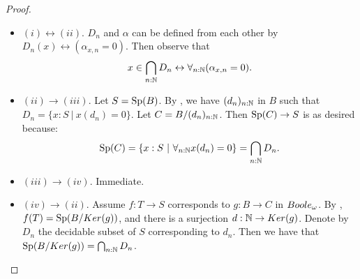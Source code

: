 \begin{proof}
\item 
  \begin{itemize}
  \item 
    $(i)\leftrightarrow (ii)$. $D_n$ and $\alpha$ can be defined from each other by 
     $D_n(x) \leftrightarrow (\alpha_{x,n} = 0)$. Then observe that
     \[
     x\in \bigcap_{n:\mathbb{N}} D_n \leftrightarrow 
      \forall_{n:\mathbb N} (\alpha_{x,n} = 0).
     \]
     
   \item $(ii) \to (iii)$. Let $S=\operatorname{Sp}(B)$. 
      By , we have $(d_n)_{n:\mathbb{N}}$ in $B$ such that $D_n = \{x:S\ |\ x(d_n) = 0\}$. 
      Let $C = B/(d_n)_{n:\mathbb{N}}$.
      Then $\operatorname{Sp}(C) \to S$ is as desired because:
      \[\operatorname{Sp}(C) = \{x:S\ |\ \forall_{n:\mathbb{N}} x(d_n) =0\}  = \bigcap_{n:\mathbb{N}} D_n.\]
   \item $(iii) \to (iv)$. Immediate.
   \item $(iv) \to (ii)$. Assume $f:T\to S$ corresponds to $g:B\to C$ in $\Boole$. 
     By , $f(T) = \operatorname{Sp}(B/Ker(g))$, and 
     there is a surjection $d:\mathbb{N}\to Ker(g)$. Denote by $D_n$ the decidable subset of $S$ corresponding to $d_n$. Then we have that $\operatorname{Sp}(B/Ker(g)) = \bigcap_{n:\mathbb{N}} D_n$. 
%

\end{itemize}
\end{proof}
